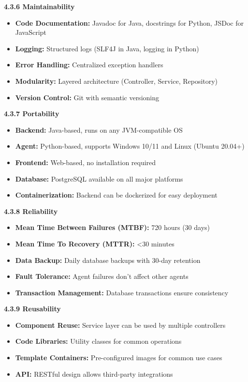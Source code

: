 \documentclass[12pt,a4paper]{article}
\begin{document}
\textbf{4.3.6 Maintainability}

\begin{itemize}[noitemsep]
    \item \textbf{Code Documentation:} Javadoc for Java, docstrings for Python, JSDoc for JavaScript
    \item \textbf{Logging:} Structured logs (SLF4J in Java, logging in Python)
    \item \textbf{Error Handling:} Centralized exception handlers
    \item \textbf{Modularity:} Layered architecture (Controller, Service, Repository)
    \item \textbf{Version Control:} Git with semantic versioning
\end{itemize}

\textbf{4.3.7 Portability}

\begin{itemize}[noitemsep]
    \item \textbf{Backend:} Java-based, runs on any JVM-compatible OS
    \item \textbf{Agent:} Python-based, supports Windows 10/11 and Linux (Ubuntu 20.04+)
    \item \textbf{Frontend:} Web-based, no installation required
    \item \textbf{Database:} PostgreSQL available on all major platforms
    \item \textbf{Containerization:} Backend can be dockerized for easy deployment
\end{itemize}

\textbf{4.3.8 Reliability}

\begin{itemize}[noitemsep]
    \item \textbf{Mean Time Between Failures (MTBF):} 720 hours (30 days)
    \item \textbf{Mean Time To Recovery (MTTR):} <30 minutes
    \item \textbf{Data Backup:} Daily database backups with 30-day retention
    \item \textbf{Fault Tolerance:} Agent failures don't affect other agents
    \item \textbf{Transaction Management:} Database transactions ensure consistency
\end{itemize}

\textbf{4.3.9 Reusability}

\begin{itemize}[noitemsep]
    \item \textbf{Component Reuse:} Service layer can be used by multiple controllers
    \item \textbf{Code Libraries:} Utility classes for common operations
    \item \textbf{Template Containers:} Pre-configured images for common use cases
    \item \textbf{API:} RESTful design allows third-party integrations
\end{itemize}
\end{document}
